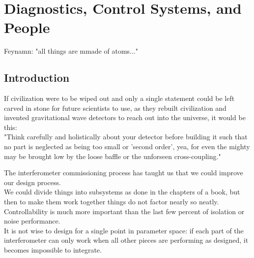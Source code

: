 \chapter[Diagnostics, Control Systems, and People]{Diagnostics, Control Systems, and People\label{ch7}}

Feynamn: "all things are mmade of atoms..."


\section{Introduction}
\label{sec7.1}
If civilization were to be wiped out and only a single statement could be left carved in stone for future scientists to use, as they rebuilt civilization and invented gravitational wave detectors to reach out into the universe, it would be this:\\

"Think carefully and holistically about your detector before building it such that no part is neglected as being too small or 'second order', yea, for even the mighty may be brought low by the loose baffle or the unforseen cross-coupling."

The interferometer commissioning process has taught us that we could improve our design process.\\

We could divide things into subsystems as done in the chapters of a book, 
but then to make them work together things do not factor nearly so neatly. Controllability is much more important than the last few percent of 
isolation or noise performance.\\

It is not wise to design for a single point in parameter space: if each 
part of the interferometer can only work when all other pieces are 
performing as designed, it becomes impossible to integrate.\\

